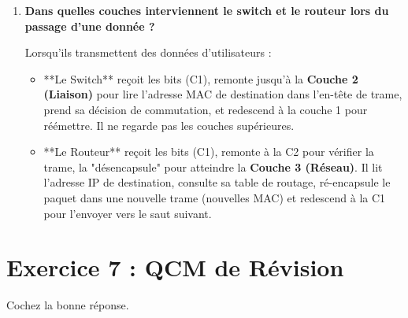 \documentclass[11pt, a4paper]{article}
\newenvironment{reponse}{\begin{reponsebox}}{\end{reponsebox}}
\begin{document}
\begin{enumerate}
    \item \textbf{Dans quelles couches interviennent le switch et le routeur lors du passage d'une donnée ?}
    \begin{reponse}
    Lorsqu'ils transmettent des données d'utilisateurs :
    \begin{itemize}
        \item **Le Switch** reçoit les bits (C1), remonte jusqu'à la \textbf{Couche 2 (Liaison)} pour lire l'adresse MAC de destination dans l'en-tête de trame, prend sa décision de commutation, et redescend à la couche 1 pour réémettre. Il ne regarde pas les couches supérieures.
        \item **Le Routeur** reçoit les bits (C1), remonte à la C2 pour vérifier la trame, la "désencapsule" pour atteindre la \textbf{Couche 3 (Réseau)}. Il lit l'adresse IP de destination, consulte sa table de routage, ré-encapsule le paquet dans une nouvelle trame (nouvelles MAC) et redescend à la C1 pour l'envoyer vers le saut suivant.
    \end{itemize}
    \end{reponse}
\end{enumerate}

\section{Exercice 7 : QCM de Révision}

Cochez la bonne réponse.
\end{document}
